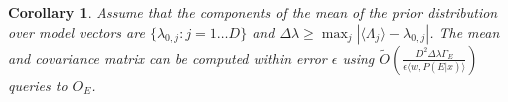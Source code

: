 \documentclass[aps,amsmath,onecolumn,amssymb]{revtex4}
\newtheorem{corollary}{Corollary}
\begin{document}


\begin{corollary}
Assume that the components of the mean of the prior distribution over model vectors are $\{\lambda_{0,j}:j=1\ldots D\}$ and $\Delta \lambda \ge \max_j |\langle \Lambda_j \rangle-\lambda_{0,j}|$.  The mean and covariance matrix can be computed within error $\epsilon$ using $\tilde{O}\left(\frac{D^2\Delta \lambda \Gamma_E}{\epsilon \langle w, P(E|x)\rangle}\right)$ queries to $O_E$.\label{cor:method}
\end{corollary}
\end{document}
